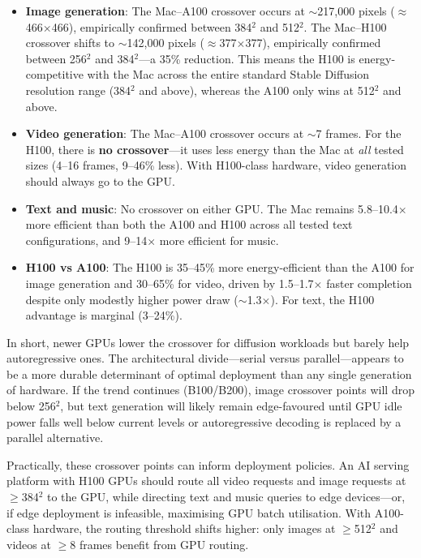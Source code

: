 \documentclass[preprint,12pt]{elsarticle}
\begin{document}
\begin{itemize}[leftmargin=*]
\item \textbf{Image generation}: The Mac--A100 crossover occurs at $\sim$217,000 pixels ($\approx$466$\times$466), empirically confirmed between 384$^2$ and 512$^2$. The Mac--H100 crossover shifts to $\sim$142,000 pixels ($\approx$377$\times$377), empirically confirmed between 256$^2$ and 384$^2$---a 35\% reduction. This means the H100 is energy-competitive with the Mac across the entire standard Stable Diffusion resolution range (384$^2$ and above), whereas the A100 only wins at 512$^2$ and above.
\item \textbf{Video generation}: The Mac--A100 crossover occurs at $\sim$7 frames. For the H100, there is \textbf{no crossover}---it uses less energy than the Mac at \textit{all} tested sizes (4--16 frames, 9--46\% less). With H100-class hardware, video generation should always go to the GPU.
\item \textbf{Text and music}: No crossover on either GPU. The Mac remains 5.8--10.4$\times$ more efficient than both the A100 and H100 across all tested text configurations, and 9--14$\times$ more efficient for music.
\item \textbf{H100 vs A100}: The H100 is 35--45\% more energy-efficient than the A100 for image generation and 30--65\% for video, driven by 1.5--1.7$\times$ faster completion despite only modestly higher power draw ($\sim$1.3$\times$). For text, the H100 advantage is marginal (3--24\%).
\end{itemize}

In short, newer GPUs lower the crossover for diffusion workloads but barely help autoregressive ones. The architectural divide---serial versus parallel---appears to be a more durable determinant of optimal deployment than any single generation of hardware. If the trend continues (B100/B200), image crossover points will drop below 256$^2$, but text generation will likely remain edge-favoured until GPU idle power falls well below current levels or autoregressive decoding is replaced by a parallel alternative.

Practically, these crossover points can inform deployment policies. An AI serving platform with H100 GPUs should route all video requests and image requests at $\geq$384$^2$ to the GPU, while directing text and music queries to edge devices---or, if edge deployment is infeasible, maximising GPU batch utilisation. With A100-class hardware, the routing threshold shifts higher: only images at $\geq$512$^2$ and videos at $\geq$8 frames benefit from GPU routing.
\end{document}
